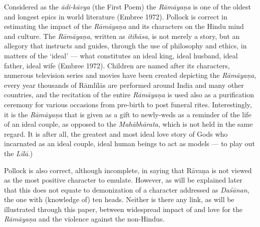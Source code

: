 Considered as the \textit{ādi-kāvya} (the First Poem) the \textit{Rāmāyaṇa} is one of the oldest and longest epics in world literature (Embree 1972). Pollock is correct in estimating the impact of the \textit{Rāmāyaṇa} and its characters on the Hindu mind and culture. The \textit{Rāmāyaṇa}, written as \textit{itihāsa}, is not merely a story, but an allegory that instructs and guides, through the use of philosophy and ethics, in matters of the ‘ideal’ — what constitutes an ideal king, ideal husband, ideal father, ideal wife (Embree 1972). Children are named after its characters, numerous television series and movies have been created depicting the \textit{Rāmāyaṇa}, every year thousands of Rāmlīlās are performed around India and many other countries, and the recitation of the entire \textit{Rāmāyaṇa} is used also as a purification ceremony for various occasions from pre-birth to post funeral rites. Interestingly, it is the \textit{Rāmāyaṇa} that is given as a gift to newly-weds as a reminder of the life of an ideal couple, as opposed to the \textit{Mahābhārata}, which is not held in the same regard. It is after all, the greatest and most ideal love story of Gods who incarnated as an ideal couple, ideal human beings to act as models — to play out the \textit{Līlā}.)

Pollock is also correct, although incomplete, in saying that Rāvaṇa is not viewed as the most positive character to emulate. However, as will be explained later that this does not equate to demonization of a character addressed as \textit{Daśānan}, the one with (knowledge of) ten heads. Neither is there any link, as will be illustrated through this paper, between widespread impact of and love for the \textit{Rāmāyaṇa} and the violence against the non-Hindus.


